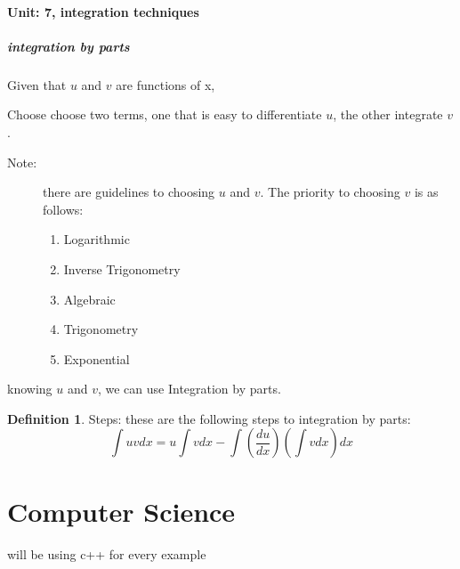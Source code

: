 \documentclass{article} %
\theoremstyle{theorem}
\theoremstyle{definition}
\newtheorem{definition}{Definition}
\begin{document}
            \paragraph{Unit: 7, integration techniques}
            \label{par:Unit-7}%
                \subparagraph{integration by parts}
                    Given that $u$ and $v$ are functions of x, 
                    \begin{itemize}
                        \item Choose choose two terms, one that is easy to differentiate $u$, the other integrate $v$.
                        \begin{description}
                            \item[Note:] there are guidelines to choosing $u$ and $v$. The priority to choosing $v$ is as follows:
                            \begin{enumerate}
                                \item Logarithmic
                                \item Inverse Trigonometry
                                \item Algebraic
                                \item Trigonometry
                                \item Exponential
                            \end{enumerate}
                        \end{description}
                        \item knowing $u$ and $v$, we can use Integration by parts. 
                        \begin{definition}
                            \item[Steps:] these are the following steps to integration by parts:
                                         \begin{equation}
                                            \label{eq:integratebyParts}
                                            \int uvdx = u\int vdx - \int (\dfrac{du}{dx})(\int vdx)dx
                                         \end{equation}
                        \end{definition}
                    \end{itemize}
\pagebreak
\section{Computer Science}\label{sec:csSec}
will be using c++ for every example
\end{document}
